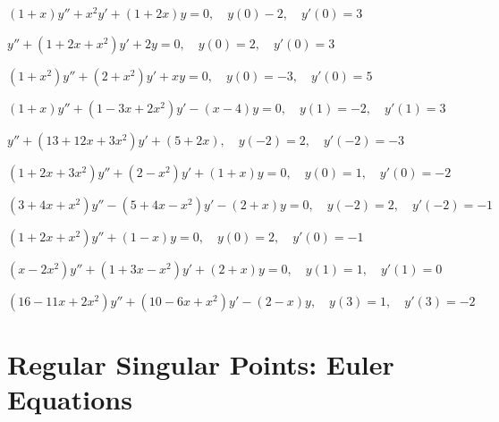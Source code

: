 \begin{exerciselist}
\item\label{exer:7.3.40}\Cex
$(1+x)y''+x^2y'+(1+2x)y=0,\quad y(0)-2,\quad y'(0)=3$

\item\label{exer:7.3.41}\Cex
$y''+(1+2x+x^2)y'+2y=0,\quad y(0)=2,\quad y'(0)=3$

\item\label{exer:7.3.42}\Cex
$(1+x^2)y''+(2+x^2)y'+xy=0,\quad y(0)=-3,\quad y'(0)=5$

\item\label{exer:7.3.43}\Cex
$(1+x)y''+(1-3x+2x^2)y'-(x-4)y=0,\quad y(1)=-2,\quad y'(1)=3$

\item\label{exer:7.3.44}\Cex
$y''+(13+12x+3x^2)y'+(5+2x),\quad y(-2)=2,\quad y'(-2)=-3$

\item\label{exer:7.3.45}\Cex
$(1+2x+3x^2)y''+(2-x^2)y'+(1+x)y=0,\quad y(0)=1,\quad y'(0)=-2$

\item\label{exer:7.3.46}\Cex
$(3+4x+x^2)y''-(5+4x-x^2)y'-(2+x)y=0,\quad y(-2)=2,\quad y'(-2)=-1$

\item\label{exer:7.3.47}\Cex
$(1+2x+x^2)y''+(1-x)y=0,\quad y(0)=2,\quad y'(0)=-1$

\item\label{exer:7.3.48}\Cex
$(x-2x^2)y''+(1+3x-x^2)y'+(2+x)y=0,\quad y(1)=1,\quad y'(1)=0$

\item\label{exer:7.3.49}\Cex
$(16-11x+2x^2)y''+(10-6x+x^2)y'-(2-x)y,\quad y(3)=1,\quad y'(3)=-2$

\end{exerciselist}


\section{Regular Singular Points: Euler Equations}
\label{sec:regular_singular}


